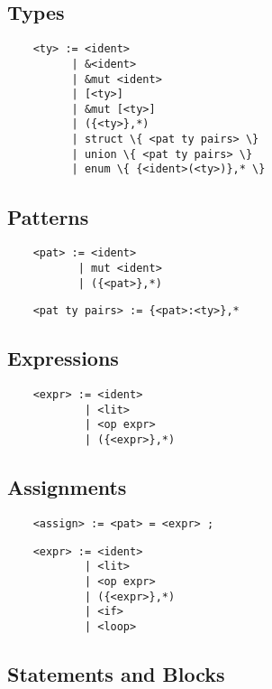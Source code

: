 \documentclass[a4paper]{article}
\begin{document}
\subsection{Types}

\begin{verbatim}
    <ty> := <ident>
          | &<ident>
          | &mut <ident>
          | [<ty>]
          | &mut [<ty>]
          | ({<ty>},*)
          | struct \{ <pat ty pairs> \}
          | union \{ <pat ty pairs> \}
          | enum \{ {<ident>(<ty>)},* \}
\end{verbatim}

\subsection{Patterns}

\begin{verbatim}
    <pat> := <ident>
           | mut <ident>
           | ({<pat>},*)
\end{verbatim}

\begin{verbatim}
    <pat ty pairs> := {<pat>:<ty>},*
\end{verbatim}

\subsection{Expressions}

\begin{verbatim}
    <expr> := <ident>
            | <lit>
            | <op expr>
            | ({<expr>},*)
\end{verbatim}

\subsection{Assignments}

\begin{verbatim}
    <assign> := <pat> = <expr> ;
\end{verbatim}

\begin{verbatim}
    <expr> := <ident>
            | <lit>
            | <op expr>
            | ({<expr>},*)
            | <if>
            | <loop>
\end{verbatim}

\subsection{Statements and Blocks}
\end{document}
